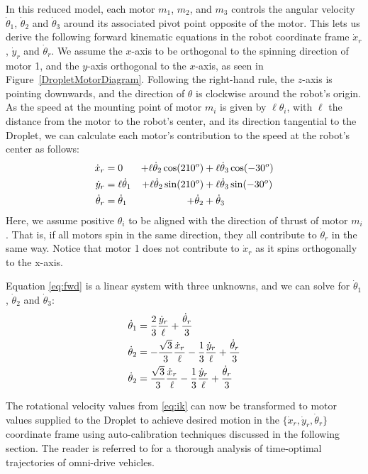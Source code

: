 \documentclass[letterpaper, 10pt, conference]{ieeeconf}
\begin{document}
In this reduced model, each motor $m_1$, $m_2$, and $m_3$ controls the angular velocity $\dot{\theta}_1$, $\dot{\theta}_2$ and $\dot{\theta}_3$ around its associated pivot point opposite of the motor. This lets us derive the following forward kinematic equations in the robot coordinate frame $\dot{x}_r$, $\dot{y}_r$ and $\dot{\theta}_r$.
We assume the $x$-axis to be orthogonal to the spinning direction of motor 1, and the $y$-axis orthogonal to the $x$-axis, as seen in Figure~\ref{DropletMotorDiagram}. Following the right-hand rule, the $z$-axis is pointing downwards, and the direction of $\theta$ is clockwise around the robot's origin. As the speed at the mounting point of motor $m_i$ is given by $\ell \theta_i$, with $\ell$ the distance from the motor to the robot's center, and its direction tangential to the Droplet, we can calculate each motor's contribution to the speed at the robot's center as follows:
\begin{align}\label{eq:fwd}
\dot{x}_r &=  0 &+\ell \dot{\theta}_2 \cos(210^o) &+ \ell \dot{\theta}_3 \cos(-30^o)\notag\\
\dot{y}_r &=  \ell \dot{\theta}_1  &+\ell \dot{\theta}_2 \sin(210^o) &+\ell \dot{\theta}_3 \sin(-30^o)\\
\dot{\theta}_r &= \dot{\theta}_1 &+ \dot{\theta}_2 &+ \dot{\theta}_3\notag  
\end{align}
Here, we assume positive $\theta_i$ to be aligned with the direction of thrust of motor $m_i$. That is, if all motors spin in the same direction, they all contribute to $\dot{\theta}_r$ in the same way. Notice that motor 1 does not contribute to $\dot{x}_r$ as it spins orthogonally to the x-axis.

Equation \ref{eq:fwd} is a linear system with three unknowns, and we can solve for $\dot{\theta}_1$, $\dot{\theta}_2$ and $\dot{\theta}_3$:
\begin{align}\label{eq:ik}
\dot{\theta}_1 & =  \frac{2}{3}\frac{\dot{y}_r}{\ell} + \frac{\dot{\theta}_r}{3}\notag\\
\dot{\theta}_2 & = -\frac{\sqrt{3}}{3}\frac{\dot{x}_r}{\ell} - \frac{1}{3}\frac{\dot{y}_r}{\ell} + \frac{\dot{\theta}_r}{3}\\
\dot{\theta}_2 & = \frac{\sqrt{3}}{3}\frac{\dot{x}_r}{\ell} - \frac{1}{3}\frac{\dot{y}_r}{\ell} + \frac{\dot{\theta}_r}{3}
\end{align}

The rotational velocity values from \eqref{eq:ik} can now be transformed to motor values supplied to the Droplet to achieve desired motion in the $\{\dot{x}_r, \dot{y}_r, \dot{\theta}_r\}$ coordinate frame using auto-calibration techniques discussed in the following section. The reader is referred to \cite{balkcom2006time} for a thorough analysis of time-optimal trajectories of omni-drive vehicles. 
\end{document}
